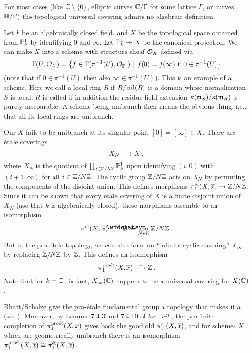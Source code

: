 \begin{exm}
	For most cases (like $\mathbb{C}\setminus\{0\}$, elliptic curves $\mathbb{C}/\Gamma$ for some lattice $\Gamma$, or curves $\mathbb{H}/\Gamma$) the topological universal covering admits no algebraic definition.
	
	Let $k$ be an algebraically closed field, and $X$ be the topological space obtained from $\mathbb{P}_k^1$ by identifying $0$ and $\infty$. Let $\IP_k^1\epimorphism X$ be the canonical projection. We can make $X$ into a scheme with structure sheaf $\mathcal{O}_X$ defined via
	\begin{equation*}
		\operatorname{\Gamma}(U,\mathcal{O}_X)=\left\{f\in\operatorname{\Gamma}(\pi^{-1}(U),\mathcal{O}_{\mathbb{P}^1})\ \middle|\  f(0)=f(\infty)\text{ if }0\in\pi^{-1}(U)\right\}
	\end{equation*}
	(note that if $0\in\pi^{-1}(U)$ then also $\infty\in\pi^{-1}(U)$). This is an example of a  scheme. Here we call a local ring $R$  if $R/\operatorname{nil}(R)$ is a domain whose normalization $S$ is local. $R$ is called  if in addition the residue field extension $\kappa(\mathfrak{m}_S)/\kappa(\mathfrak{m}_R)$ is purely inseparable. A scheme being unibranch then means the obvious thing, i.e., that all its local rings are unibranch.
	
	Our $X$ fails to be unibranch at its singular point $[0]=[\infty]\in X$. There are étale coverings
	\begin{equation*}
		X_N\morphism X\,,
	\end{equation*}
	where $X_N$ is the quotient of $\coprod_{i\in\mathbb{Z}/N\mathbb{Z}}\mathbb{P}_k^1$ upon identifying $(i,0)$ with $(i+1,\infty)$ for all $i\in\mathbb{Z}/N\mathbb{Z}$. The cyclic group $\mathbb{Z}/N\mathbb{Z}$ acts on $X_N$ by permuting the components of the disjoint union. This defines morphisms $\pi_1^\et(X,\ov{x})\morphism\IZ/N\IZ$. Since it can be shown that every étale covering of $X$ is a finite disjoint union of $X_N$ (use that $k$ is algebraically closed), these morphisms assemble to an isomorphism
	\begin{equation*}
		\pi_1^\et(X,\ov{x})\isomorphism\roof{\IZ}\coloneqq\limit_{N\in\IN}\IZ/N\IZ\,.
	\end{equation*}
	But in the pro-étale topology, we can also form an \enquote{infinite cyclic covering} $X_\infty$ by replacing $\mathbb{Z}/N\mathbb{Z}$ by $\mathbb{Z}$. This defines an isomorphism
	\begin{equation*}
		\pi_1^\proet(X,\ov{x})\isomorphism \IZ\,.
	\end{equation*}
	Note that for $k=\mathbb{C}$, in fact, $X_\infty(\mathbb{C})$ happens to be a universal covering for $X(\mathbb{C})$.
	
	Bhatt/Scholze give the pro-étale fundamental group a topology that makes it a  (see \cite[Definition~7.1.1]{proetale}). Moreover, by Lemma~7.4.3 and 7.4.10 of \emph{loc.\ cit.}, the pro-finite completion of $\pi_1^\proet(X,\ov{x})$ gives back the good old $\pi_1^\et(X,\ov{x})$, and for schemes $X$ which are geometrically unibranch there is an isomorphism $\pi_1^\proet(X,\ov{x})\cong \pi_1^\et(X,\ov{x})$.
\end{exm}
